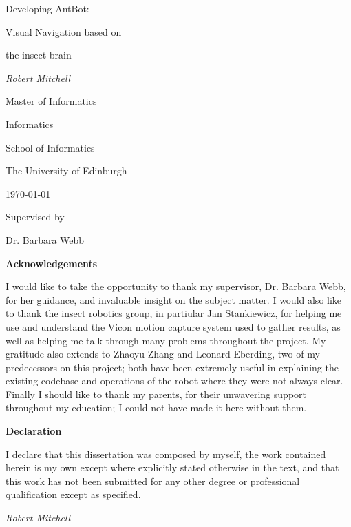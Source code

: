 \documentclass[a4paper,11pt,twoside,openright]{article}
\begin{document}
\centering
\vspace*{6cm}
{\huge Developing AntBot: \par Visual Navigation based on \par the insect brain \par}
\vspace{1cm}
{\Large \textit{Robert Mitchell}}

\vspace{3cm}

{\large Master of Informatics \par}
{\large Informatics \par}
{\large School of Informatics \par}
{\large The University of Edinburgh \par}
\large \today \par

\vfill
Supervised by\par
Dr. Barbara Webb

\newpage
\thispagestyle{empty}
\mbox{}
\newpage
\centering
{\LARGE \textbf{Acknowledgements}}
\begin{flushleft}
 {\small
  I would like to take the opportunity to thank my supervisor, Dr. Barbara Webb, for her
  guidance, and invaluable insight on the subject matter. I would also like to thank the
  insect robotics group, in partiular Jan Stankiewicz, for helping me use and understand the
  Vicon motion capture system used to gather results, as well as helping me talk through many
  problems throughout the project. My gratitude also extends to
  Zhaoyu Zhang and Leonard Eberding, two of my predecessors on this project; both have been
  extremely useful in explaining the existing codebase and operations of the robot where they
  were not always clear. Finally I should like to thank my parents, for their unwavering support
  throughout my education; I could not have made it here without them. }
\end{flushleft}  

\newpage
\thispagestyle{empty}
\mbox{}
\newpage
\centering
{\LARGE\textbf{Declaration}}
\begin{flushleft}
  {\small
    I declare that this dissertation was composed by myself, the work
    contained herein is my own except where explicitly stated otherwise
    in the text, and that this work has not been submitted for any other
    degree or professional qualification except as specified.
    \par 

    \textit{Robert Mitchell}}

\end{flushleft}
\end{document}

